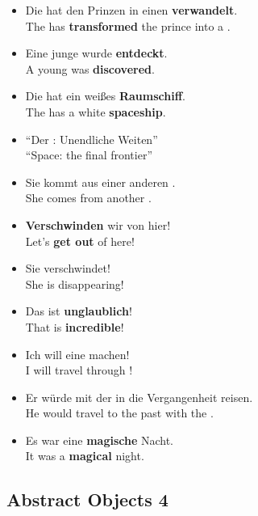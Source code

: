 \begin{itemize}
  \item  Die  hat den Prinzen in einen  \textbf{verwandelt}. \\
  The  has \textbf{transformed} the prince into a .
  \item  Eine junge  wurde \textbf{entdeckt}. \\
  A young  was \textbf{discovered}.
  \item  Die  hat ein wei{\ss}es \textbf{Raumschiff}. \\
  The  has a white \textbf{spaceship}.
  \item  ``Der :  Unendliche Weiten'' \\
  ``Space: the final frontier''
  \item  Sie kommt aus einer anderen . \\
  She comes from another .
  \item  \textbf{Verschwinden} wir von hier! \\
  Let's \textbf{get out} of here!
  \item  Sie verschwindet! \\
  She is disappearing!
  \item  Das ist \textbf{unglaublich}! \\
  That is \textbf{incredible}!
  \item  Ich will eine  machen! \\
  I will travel through !
  \item  Er w{\"u}rde mit der  in die Vergangenheit reisen. \\
  He would travel to the past with the .
  \item  Es war eine \textbf{magische} Nacht. \\
  It was a \textbf{magical} night.
\end{itemize}


\pagebreak
\subsection{Abstract Objects 4}

